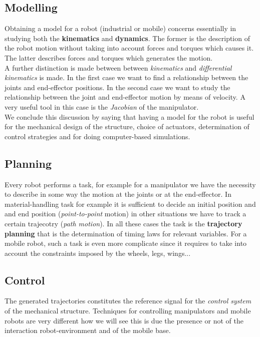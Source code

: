 \subsection{Modelling}
Obtaining a model for a robot (industrial or mobile) concerns essentially in studying both the \textbf{kinematics} and \textbf{dynamics}. The former is the description of the robot motion without taking into account forces and torques which causes it. The latter describes forces and torques which generates the motion.\\
A further distinction is made between between \textit{kinematics} and \textit{differential kinematics} is made. In the first case we want to find a relationship between the joints and end-effector positions. In the second case we want to study the relationship between the joint and end-effector motion by means of velocity. A very useful tool in this case is the \textit{Jacobian} of the manipulator.\\
We conclude this discussion by saying that having a model for the robot is useful for the mechanical design of the structure, choice of actuators, determination of control strategies and for doing computer-based simulations.

\subsection{Planning}
Every robot performs a task, for example for a manipulator we have the necessity to describe in some way the motion at the joints or at the end-effector. In material-handling task for example it is sufficient to decide an initial position and and end position (\textit{point-to-point} motion) in other situations we have to track a certain trajecotry (\textit{path motion}). In all these cases the task is the \textbf{trajectory planning} that is the determination of timing laws for relevant variables. For a mobile robot, such a task is even more complicate since it requires to take into account the constraints imposed by the wheels, legs, wings...

\subsection{Control}
The generated trajectories constitutes the reference signal for the \textit{control system} of the mechanical structure. Techniques for controlling manipulators and mobile robots are very different how we will see this is due the presence or not of the interaction robot-environment and of the mobile base.

